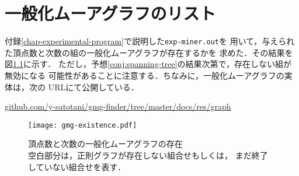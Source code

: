 
\chapter{一般化ムーアグラフのリスト}
\label{chap:list-of-gmg}
付録\ref{chap-experimental-program}で説明した\verb|exp-miner.out|を
用いて，与えられた頂点数と次数の組の一般化ムーアグラフが存在するかを
求めた．その結果を図\ref{fig:gmg-existence}に示す．
ただし，予想\ref{conj:spanning-tree}の結果次第で，存在しない組が無効になる
可能性があることに注意する．ちなみに，一般化ムーアグラフの実体は，次の
URLにて公開している．

\url{github.com/y-satotani/gmg-finder/tree/master/docs/res/graph}

\begin{figure}[htbp]
  \centering
  \captionsetup{justification=centering}
  \texttt{[image: gmg-existence.pdf]}
  \caption{頂点数と次数の一般化ムーアグラフの存在\\
    空白部分は，正則グラフが存在しない組合せもしくは，
    まだ終了していない組合せを表す．}
  \label{fig:gmg-existence}
\end{figure}
